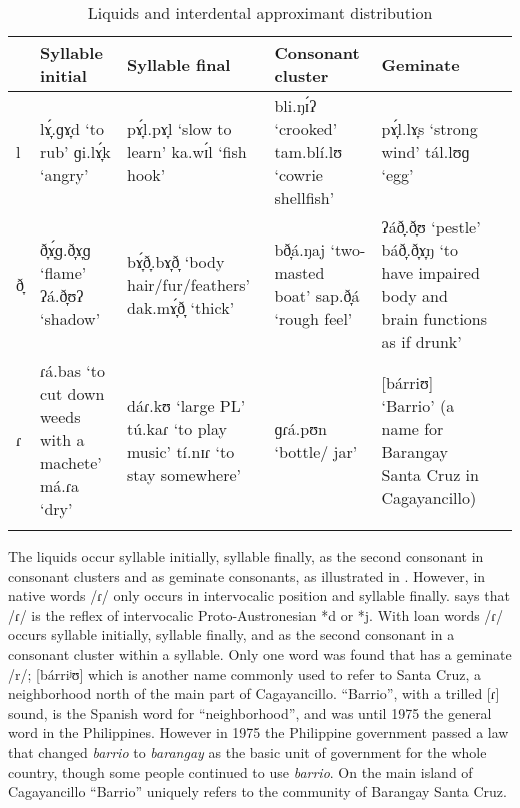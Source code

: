 \begin{table}[b]
\caption{Liquids and interdental approximant distribution}
\label{tab2.5}
\begin{tabularx}{\textwidth}{lQQQQQ}
\lsptoprule
& Syllable initial & Syllable final & Consonant cluster & Geminate \\
\midrule
l & lɤ̞́.ɡɤ̞d ‘to rub’
\newline
ɡi.lɤ̞́k ‘angry’ &
pɤ̞́l.pɤ̞l ‘slow to learn’
\newline
ka.wɪ́l ‘fish hook’ &
bli.ŋɪ́ʔ ‘crooked’
\newline
tam.blí.lʊ ‘cowrie shellfish’ &
pɤ̞́l.lɤ̞s  ‘strong wind’
\newline
tál.lʊɡ ‘egg’ \\
\tablevspace
ð̞ & ð̞ɤ̞́ɡ.ð̞ɤ̞ɡ ‘flame’
\newline
ʔá.ð̞ʊʔ ‘shadow’ &
bɤ̞́ð̞.bɤ̞ð̞ ‘body hair/fur/feathers’
\newline
dak.mɤ̞́ð̞ ‘thick’ &
bð̞á.ŋaj ‘two-masted boat’
\newline
sap.ð̞á ‘rough feel’ &
ʔáð̞.ð̞ʊ ‘pestle’
\newline
báð̞.ð̞ɤ̞ŋ ‘to have impaired body and brain functions as if drunk’ \\
\tablevspace
ɾ & ɾá.bas ‘to cut down weeds with a machete’
\newline
má.ɾa ‘dry’ &
dáɾ.kʊ ‘large PL’
\newline
tú.kaɾ ‘to play music’
\newline
tí.nɪɾ ‘to stay somewhere’ &
ɡɾá.pʊn ‘bottle/ jar’ &
[bárriʊ] ‘Barrio’ (a name for Barangay Santa Cruz in Cagayancillo) \\
\lspbottomrule
\end{tabularx}
\end{table}

 The liquids occur syllable initially, syllable finally, as the second consonant in consonant clusters and as geminate consonants, as illustrated in . However, in native words /ɾ/ only occurs in intervocalic position and syllable finally. \citet[21]{harmon1977} says that /ɾ/ is the reflex of intervocalic Proto-Austronesian *d or *j. With loan words /ɾ/ occurs syllable initially, syllable finally, and as the second consonant in a consonant cluster within a syllable. Only one word was found that has a geminate /r/; [bárriʲʊ] which is another name commonly used to refer to Santa Cruz, a neighborhood north of the main part of Cagayancillo. “Barrio”, with a trilled [ɾ] sound, is the Spanish word for “neighborhood”, and was until 1975 the general word in the Philippines. However in 1975 the Philippine government passed a law that changed \textit{barrio} to \textit{barangay} as the basic unit of government for the whole country, though some people continued to use \textit{barrio}. On the main island of Cagayancillo “Barrio” uniquely refers to the community of Barangay Santa Cruz.


